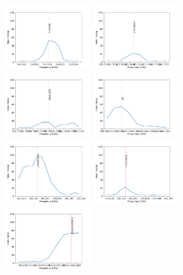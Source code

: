 \documentclass{aa}
\begin{document}
   \begin{figure}
\includegraphics[width=0.33\textwidth]{spw2_CH3CHO}
\includegraphics[width=0.33\textwidth]{spw2_CH3COOH}
\includegraphics[width=0.33\textwidth]{spw2_(CH3)2CO}
\includegraphics[width=0.33\textwidth]{spw2_CP}
\includegraphics[width=0.33\textwidth]{spw2_c-H13CCCH}
\includegraphics[width=0.33\textwidth]{spw2_CH3CH2CN}
\includegraphics[width=0.33\textwidth]{spw2_g'Ga-(CH2OH)2}

\end{figure}
\end{document}
